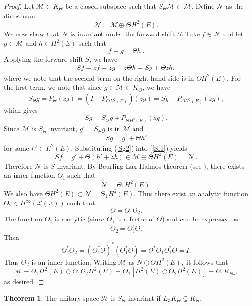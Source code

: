 \documentclass{amsart}
\theoremstyle{definition}
\newtheorem{thm}{Theorem}[section]
\newcommand{\h}{\mathcal{\mathcal H}}
\begin{document}
\begin{proof}
Let $\mathcal{M}\subset K_{\Theta}$ be a closed subspace such that $S_{\Theta}\mathcal{M}\subset \mathcal{M}$. Define $\mathcal{N}$ as the direct sum
$$\mathcal{N}=\mathcal{M}\oplus \Theta H^{2}(E).$$ We now show that $\mathcal{N}$ is invariant under the forward shift $S$. Take $f\in \mathcal{N}$ and let $g\in \mathcal{M}$ and $h\in H^{2}(E)$ such that
$$f=g+\Theta h\,.$$ %
Applying the forward shift $S$, we have 
\begin{eqnarray} Sf=zf=zg+z\Theta h=Sg+\Theta zh,\label{Sf1}\end{eqnarray}
where we note that the second term on the right-hand side is in $\Theta H^{2}(E)$. For the first term, we note that since $g\in \mathcal{M}\subset K_{\Theta}$, we have
$$S_{\Theta}g=P_{\Theta}(zg)=(I-P_{\Theta H^{2}(E)})(zg)=Sg-P_{\Theta H^{2}(E)}(zg),$$ which gives
$$Sg=S_{\Theta}g+P_{\Theta H^{2}(E)}(zg).$$
Since $\mathcal{M}$ is $S_{\Theta}$ invariant,  $g'=S_{\Theta}g$ is in $\mathcal{M}$ and 
\begin{eqnarray} Sg=g'+\Theta h'\label{Sg2}\end{eqnarray} for some %
 $h'\in H^{2}(E).$
Substituting (\ref{Sg2}) into (\ref{Sf1}) yields
$$Sf=%
g'+\Theta(h'+zh)%
\in \mathcal{M}\oplus\Theta H^{2}(E)=\mathcal{N}\,.$$
Therefore $\mathcal{N}$ is $S$-invariant. By  Beurling-Lax-Halmos theorem (see \cite{AM}), there exists an inner function $\Theta_{1}$ such that $$\mathcal{N}=\Theta_{1}H^{2}(E).$$
We also have $\Theta H^{2}(E)\subset \mathcal{N}=\Theta_{1}H^{2}(E)$. Thus there exist an analytic function $\Theta_{2}\in H^{\infty}(\mathcal{L}(E))$ such that $$\Theta=\Theta_{1}\Theta_{2}.$$ 
The function $\Theta_2$ is analytic (since $\Theta_{1}$ is a factor of $\Theta$) and can be expressed as
$$\Theta_{2}=\Theta_1^{*}\Theta.$$ Then
$$\Theta_{2}^{*}\Theta_2=(\Theta_1^{*}\Theta)^{*}(\Theta_1^{*}\Theta)=\Theta^*\Theta_1\Theta_{1}^{*}\Theta=I.$$ 
Thus $\Theta_{2}$ is an inner function. Writing $\mathcal{M}$ as
$N\ominus \Theta H^{2}(E),$ it follows that
$$\mathcal{M}=\Theta_{1}H^{2}(E)\ominus \Theta_{1}\Theta_{2}H^{2}(E)=\Theta_{1}[H^{2}(E)\ominus \Theta_{2}H^{2}(E)]=\Theta_{1}K_{\Theta_2},$$
as desired.
\end{proof}

\begin{thm}\label{inv}
    The unitary space $\h$ is $S_\Theta$-invariant if $L_{\Phi}K_{\Theta}\subseteq K_{\Theta}$.
\end{thm}
\end{document}
